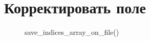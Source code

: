 \documentclass[12pt, a4paper]{article}
\begin{document}

\newpage
\section{Корректировать поле}


\begin{figure}[H]
    \caption{save\_indices\_array\_on\_file()}
\end{figure}

\end{document}
